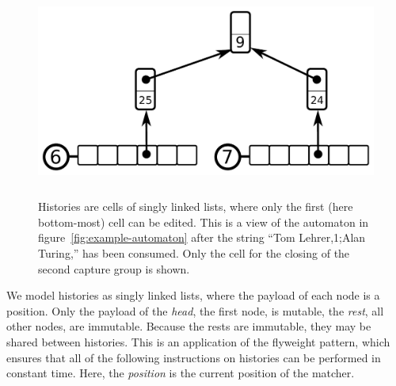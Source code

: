 \documentclass[11pt,a4paper,twoside,openright]{Thesis}
\theoremstyle{definition}
\newcommand{\str}[1]{``#1''}
\newcommand{\Figref}[1]{figure~\ref{fig:#1}}
\begin{document}
\begin{figure}[htpb]
  \centering
  \includegraphics[height=7cm]{graphs/cells}
  \caption{Histories are cells of singly linked lists, where only the first 
    (here bottom-most) cell can be edited. This is a view of the automaton in 
    \Figref{example-automaton} after the string \str{Tom Lehrer,1;Alan 
  Turing,} has been consumed. Only the cell for the closing of the second 
capture group is shown.}
  \label{fig:cells}
\end{figure}

We model histories as singly linked lists, where the payload of each node is a
position.  Only the payload of the \emph{head}, the first node, is mutable, the
\emph{rest}, all other nodes, are immutable.  Because the rests are immutable,
they may be shared between histories.  This is an application of the flyweight
pattern, which ensures that all of the following instructions on histories can
be performed in constant time. Here, the \emph{position} is the current
position of the matcher.
\end{document}
